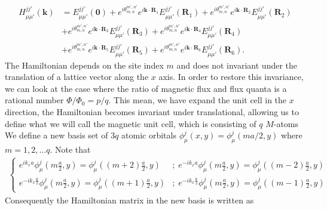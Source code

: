 \documentclass{report}
\begin{document}
\begin{equation}
	\begin{aligned}
		H_{\mu\mu'}^{jj'}(\mathbf{k})
		 & = E_{\mu\mu'}^{jj'}(\mathbf{0}) + e^{i\theta_{m,n}^{m',n'} }e^{i \mathbf{k} \cdot \mathbf{R}_{1}} E_{\mu\mu'}^{jj'}(\mathbf{R}_{1}) + e^{i\theta_{m,n}^{m',n'} } e^{i \mathbf{k} \cdot \mathbf{R}_{2}} E_{\mu\mu'}^{jj'}(\mathbf{R}_{2}) \\
		 & + e^{i\theta_{m,n}^{m',n'} } e^{i \mathbf{k} \cdot \mathbf{R}_{3}} E_{\mu\mu'}^{jj'}(\mathbf{R}_{3}) + e^{i\theta_{m,n}^{m',n'} }e^{i \mathbf{k} \cdot \mathbf{R}_{4}} E_{\mu\mu'}^{jj'}(\mathbf{R}_{4})                                 \\
		 & + e^{i\theta_{m,n}^{m',n'} } e^{i \mathbf{k} \cdot \mathbf{R}_{5}} E_{\mu\mu'}^{jj'}(\mathbf{R}_{5}) + e^{i\theta_{m,n}^{m',n'} }e^{i \mathbf{k} \cdot \mathbf{R}_{6}} E_{\mu\mu'}^{jj'}(\mathbf{R}_{6}).
	\end{aligned}
\end{equation}
The Hamiltonian depends on the site index $m$ and does not invariant under the translation of a lattice vector along the $x$ axis. In order to restore this invariance, we can look at the case where the ratio of magnetic flux and flux quanta is a rational number $\Phi / \Phi_{0} = p / q$. This mean, we have expand the unit cell in the $x$ direction, the Hamiltonian becomes invariant under translational, allowing us to define what we will call the magnetic unit cell, which is consisting of $q$ $M$-atoms %
We define a new basis set of $3q$ atomic orbitals $\phi_{\mu}^{j} (x,y) = \phi_{\mu}^{j} (ma/2,y)$ where $m = 1,2,...q$. Note that
\begin{gather}
	\begin{cases}
		e^{i k_{x} a} \phi_{\mu}^{j} \left(m \frac{a}{2},y\right) = \phi_{\mu}^{j} \left((m+2)\frac{a}{2},y\right)            & ;\;  e^{-i k_{x} a} \phi_{\mu}^{j} \left(m\frac{a}{2},y\right) = \phi_{\mu}^{j} \left((m-2)\frac{a}{2},y\right)           \\
		e^{-i k_{x} \frac{a}{2}} \phi_{\mu}^{j} \left(m \frac{a}{2},y\right) = \phi_{\mu}^{j} \left((m+1)\frac{a}{2},y\right) & ;\;  e^{-i k_{x} \frac{a}{2}} \phi_{\mu}^{j} \left(m\frac{a}{2},y\right) = \phi_{\mu}^{j} \left((m-1)\frac{a}{2},y\right)
	\end{cases}
\end{gather}
Consequently the Hamiltonian matrix in the new basis is written as
\end{document}
